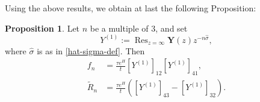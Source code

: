 \documentclass[usenames,dvipsnames]{article}
\theoremstyle{definition}
\newtheorem{prop}{Proposition}[section]
\DeclareMathOperator*{\Ress}{Res}
\newcommand{\Res}{\displaystyle\Ress}
\numberwithin{equation}{section}
\numberwithin{figure}{section}
\begin{document}
Using the above results, we obtain at last the following Proposition:
    \begin{prop}\label{prop:RHP-coeff-expression}
        Let $n$ be a multiple of $3$, and set
            \begin{equation}
                Y^{(1)} := \Res_{z=\infty} \boldsymbol{Y}(z)z^{-n\hat{\sigma}},
            \end{equation}
        where $\hat{\sigma}$ is as in \eqref{hat-sigma-def}. Then
            \begin{align}
                f_n &= \frac{\tau e^{H}}{t} [Y^{(1)}]_{12}[Y^{(1)}]_{41},\\
                \tilde{R}_n &= \frac{\tau e^{H}}{t}\left([Y^{(1)}]_{43} - [Y^{(1)}]_{32}\right).
            \end{align}
    \end{prop}
\end{document}
